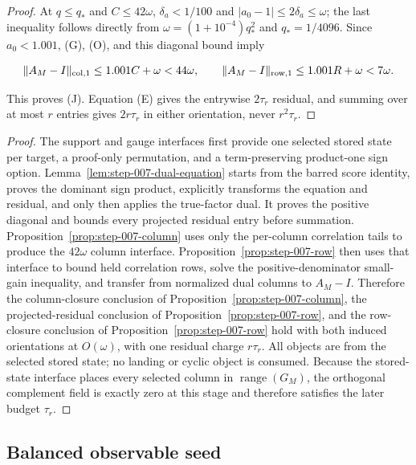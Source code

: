 \begin{proposition}
\begin{proof}
At $q\le q_*$ and $C\le42\omega$, $\delta_a<1/100$ and
$|a_0-1|\le2\delta_a\le\omega$; the last inequality follows directly from
$\omega=(1+10^{-4})q_*^2$ and $q_*=1/4096$.
Since $a_0<1.001$, (G), (O), and this diagonal bound imply

\[
\|A_M-I\|_{\rm col,1}\le1.001C+\omega<44\omega,\qquad
\|A_M-I\|_{\rm row,1}\le1.001R+\omega<7\omega.
\]

This proves (J). Equation (E) gives the entrywise $2\tau_r$ residual, and
summing over at most $r$ entries gives $2r\tau_r$ in either orientation,
never $r^2\tau_r$.\quad\Box

\end{proof}
\end{proposition}
\begin{proof}
The support and gauge interfaces first provide one selected
stored state per target, a proof-only permutation, and a term-preserving
product-one sign option.  Lemma~\ref{lem:step-007-dual-equation} starts from the
barred score identity, proves the dominant sign product, explicitly
transforms the equation and residual, and only then applies the true-factor
dual.  It proves the positive diagonal and bounds every projected residual
entry before summation.  Proposition~\ref{prop:step-007-column} uses
only the per-column correlation tails to produce the $42\omega$
column interface.  Proposition~\ref{prop:step-007-row} then uses that interface
to bound held correlation rows, solve the positive-denominator small-gain
inequality, and transfer from normalized dual columns to $A_M-I$. Therefore
the column-closure conclusion of Proposition~\ref{prop:step-007-column}, the projected-residual conclusion of Proposition~\ref{prop:step-007-row}, and the row-closure conclusion of Proposition~\ref{prop:step-007-row} hold with both induced orientations at
$O(\omega)$, with one residual charge $r\tau_r$. All objects are from the
selected stored state; no landing or cyclic object is consumed.
Because the stored-state interface places every selected column in
$\operatorname{range}(G_M)$, the orthogonal complement field is exactly zero
at this stage and therefore satisfies the later budget $\tau_r$.
\end{proof}

\subsection{Balanced observable seed}\label{app:step-008}

